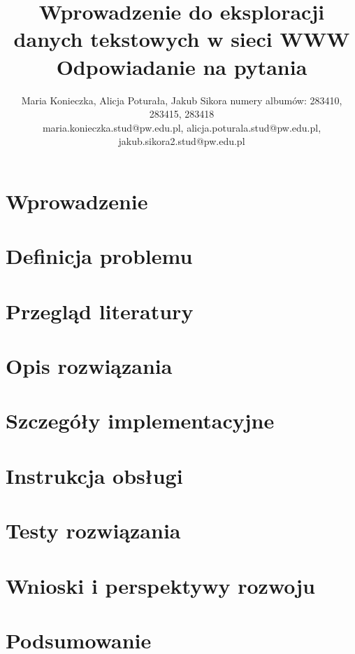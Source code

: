 \documentclass{article}
\title{Wprowadzenie do eksploracji danych tekstowych w sieci WWW\\ Odpowiadanie na pytania}
\author{
Maria Konieczka, Alicja Poturała, Jakub Sikora
\affiliations
numery albumów: 283410, 283415, 283418 \\
\emails
maria.konieczka.stud@pw.edu.pl, alicja.poturala.stud@pw.edu.pl, jakub.sikora2.stud@pw.edu.pl
}
\begin{document}
\maketitle

\section{Wprowadzenie}
\label{sec:wprowadzenie}


\section{Definicja problemu}
\label{sec:wprowadzenie}


\section{Przegląd literatury}
\label{sec:przeglad}


\section{Opis rozwiązania}
\label{sec:opis-rozwiazania}


\section{Szczegóły implementacyjne}
\label{sec:implementacja}


\section{Instrukcja obsługi}
\label{sec:instrukcja}


\section{Testy rozwiązania}
\label{sec:testy}


\section{Wnioski i perspektywy rozwoju}
\label{sec:wnioski}


\section{Podsumowanie}
\label{sec:podsumowanie}





\end{document}
